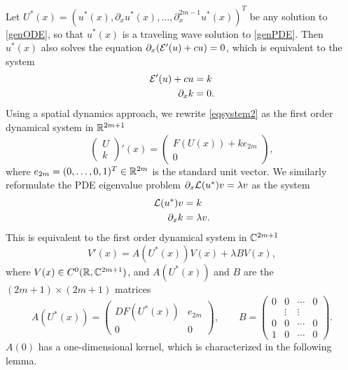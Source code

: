 \documentclass[12pt]{elsarticle}
\theoremstyle{plain}
\theoremstyle{definition}
\theoremstyle{remark}
\numberwithin{theorem}{section}
\numberwithin{equation}{section}
\begin{document}
Let $U^*(x) = (u^*(x), \partial_x u^*(x), \dots, \partial_x^{2m-1}u^*(x) )^T$ be any solution to \cref{genODE}, so that $u^*(x)$ is a traveling wave solution to \cref{genPDE}.
Then $u^*(x)$ also solves the equation $\partial_x(\mathcal{E}'(u) + cu) = 0$, which is equivalent to the system
\begin{equation}\label{eqsystem2}
\begin{aligned}
\mathcal{E}'(u) + cu &= k \\
\partial_x k &= 0.
\end{aligned}
\end{equation}
Using a spatial dynamics approach, we rewrite \cref{eqsystem2} as the first order dynamical system in $\mathbb{R}^{2m+1}$ 
\begin{equation}\label{spsystem2}
\begin{pmatrix}
U \\ k
\end{pmatrix}'(x) =
\begin{pmatrix} 
F(U(x)) + k e_{2m} \\ 0
\end{pmatrix},
\end{equation}
where $e_{2m} = (0, \dots, 0, 1)^T \in \mathbb{R}^{2m}$ is the standard unit vector. We similarly reformulate the PDE eigenvalue problem $\partial_x \mathcal{L}(u^*) v = \lambda v$ as the system 
\begin{equation}\label{genPDEeig2}
\begin{aligned}
\mathcal{L}(u^*) v &= k \\
\partial_x k &= \lambda v.
\end{aligned}
\end{equation}
This is equivalent to the first order dynamical system in $\mathbb{C}^{2m+1}$
\begin{equation}\label{PDEeigsystem}
V'(x) = A(U^*(x))V(x) + \lambda B V(x),
\end{equation}
where $V(x) \in C^0(\mathbb{R},\mathbb{C}^{2m+1})$, and $A(U^*(x))$ and $B$ are the $(2m+1) \times (2m+1)$ matrices
\begin{equation}\label{defAB}
A(U^*(x)) = 
\begin{pmatrix}
DF(U^*(x)) & e_{2m}\\
0 & 0
\end{pmatrix}, \qquad
B = \begin{pmatrix}0 & 0 & \cdots & 0 \\ & 
\vdots & \vdots & \\0 & 0 & \cdots & 0 \\ 1 & 0 & \cdots & 0 \end{pmatrix}.
\end{equation}
$A(0)$ has a one-dimensional kernel, which is characterized in the following lemma. 
\end{document}
